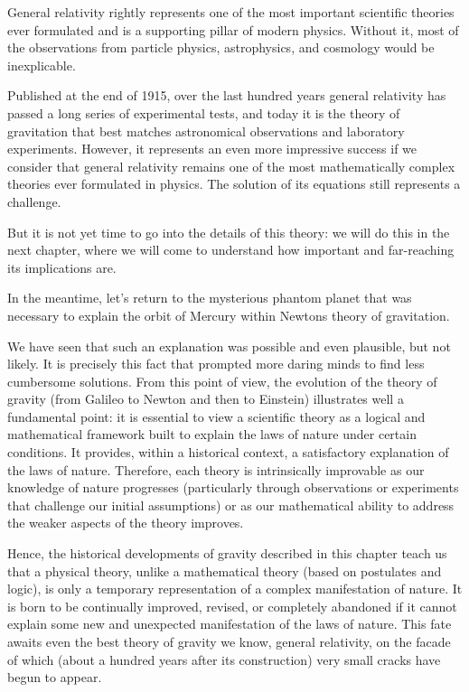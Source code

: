 General relativity rightly represents one of the most
important scientific theories ever formulated and is a supporting pillar of modern
physics. Without it, most of the observations from particle physics, astrophysics, and
cosmology would be inexplicable.

Published at the end of 1915, over the last hundred years general
relativity has passed a long series of experimental tests, and
today it is the theory of gravitation that best matches astronomical observations and
laboratory experiments. However, it represents an even more impressive success if we
consider that general relativity remains one of the most mathematically complex theories
ever formulated in physics. The solution of its equations still represents a challenge.

But it is not yet time to go into the details of this theory: we will do this in the
next chapter, where we will come to understand how important and far-reaching its
implications are.

In the meantime, let's return to the mysterious phantom planet that was necessary to
explain the orbit of Mercury within Newton\textquotesingle s theory of gravitation.

We have seen that such an explanation was possible and even plausible, but not likely.
It is precisely this fact that prompted more daring minds to find less cumbersome
solutions. From this point of view, the evolution of the theory of gravity (from Galileo
to Newton and then to Einstein) illustrates well a fundamental point: it is essential to
view a scientific theory as a logical and mathematical framework built to explain the
laws of nature under certain conditions. It provides, within a historical context, a
satisfactory explanation of the laws of nature. Therefore, each theory is intrinsically
improvable as our knowledge of nature progresses (particularly through observations or
experiments that challenge our initial assumptions) or as our mathematical ability to
address the weaker aspects of the theory improves.

Hence, the historical developments of gravity described in this chapter teach us that a
physical theory, unlike a mathematical theory (based on postulates and logic), is only a
temporary representation of a complex manifestation of nature. It is born to be
continually improved, revised, or completely abandoned if it cannot explain some new and
unexpected manifestation of the laws of nature. This fate awaits even the best theory of
gravity we know, general relativity, on the facade of which
(about a hundred years after its construction) very small cracks have begun to appear.
